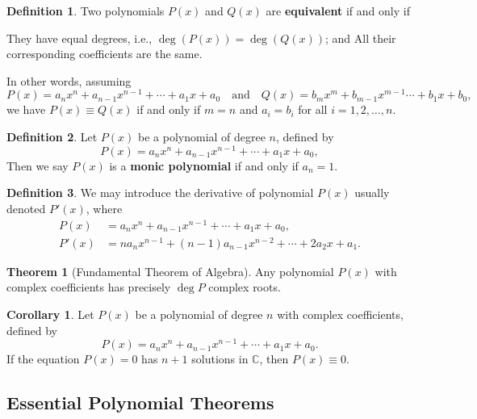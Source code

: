 \documentclass[12pt,a4paper]{memoir}
\theoremstyle{definition}
\newtheorem*{definition}{Definition}
\newtheorem{theorem}{Theorem}
\newtheorem{corollary}{Corollary}
\begin{document}
\begin{tcolorbox}[title={Equivalent Polynomials, Monic Polynomials}]
	\begin{definition}
		Two polynomials $P(x)$ and $Q(x)$ are \textbf{equivalent} if and only if 
		\begin{tasks}
			\task They have equal degrees, i.e., $\deg(P(x))=\deg(Q(x))$; and
			\task All their corresponding coefficients are the same.
		\end{tasks}
		In other words, assuming
		\[P(x)=a_nx^n+a_{n-1}x^{n-1}+\cdots+a_1x+a_0 \quad \text{and} \quad Q(x)=b_mx^m+b_{m-1}x^{m-1}\cdots+b_1x+b_0,\]
		we have $P(x) \equiv Q(x)$ if and only if $m=n$ and $a_i=b_i$ for all $i=1,2,\dots,n$.
	\end{definition}
	
	\begin{definition}
		Let $P(x)$ be a polynomial of degree $n$, defined by
		\[P(x)=a_nx^n+a_{n-1}x^{n-1}+\cdots+a_1x+a_0,\]
		Then we say $P(x)$ is a \textbf{monic polynomial} if and only if $a_n=1$.
	\end{definition}
	
	\begin{definition}
		We may introduce the derivative of polynomial $P(x)$ usually denoted $P'(x)$, where
		\begin{align*}
			P(x) &= a_nx^n+a_{n-1}x^{n-1}+\cdots+a_1x+a_0,\\
			P'(x) &= na_nx^{n-1} + (n-1)a_{n-1}x^{n-2}+\cdots + 2a_2x+a_1.
		\end{align*}
	\end{definition}
\end{tcolorbox}

\begin{theorem}[Fundamental Theorem of Algebra]
	Any polynomial $P(x)$ with complex coefficients has precisely $\deg P$ complex roots.
\end{theorem}


\begin{corollary}
	Let $P(x)$ be a polynomial of degree $n$ with complex coefficients, defined by
	\[P(x)=a_nx^n+a_{n-1}x^{n-1}+\cdots+a_1x+a_0.\]
	If the equation $P(x)=0$ has $n+1$ solutions in $\mathbb C$, then $P(x)\equiv 0$.
\end{corollary}



\subsection{Essential Polynomial Theorems}
\end{document}
